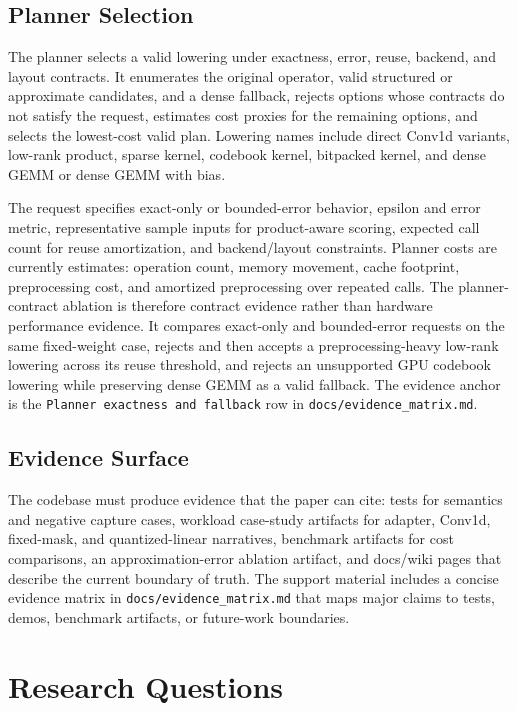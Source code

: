 \documentclass[11pt]{article}
\begin{document}
\subsection{Planner Selection}

The planner selects a valid lowering under exactness, error, reuse, backend,
and layout contracts. It enumerates the original operator, valid structured or
approximate candidates, and a dense fallback, rejects options whose contracts
do not satisfy the request, estimates cost proxies for the remaining options,
and selects the lowest-cost valid plan. Lowering names include direct Conv1d
variants, low-rank product, sparse kernel, codebook kernel, bitpacked kernel,
and dense GEMM or dense GEMM with bias.

The request specifies exact-only or bounded-error behavior, epsilon and error
metric, representative sample inputs for product-aware scoring, expected call
count for reuse amortization, and backend/layout constraints. Planner costs are
currently estimates: operation count, memory movement, cache footprint,
preprocessing cost, and amortized preprocessing over repeated calls. The
planner-contract ablation is therefore contract evidence rather than hardware
performance evidence. It compares exact-only and bounded-error requests on the
same fixed-weight case, rejects and then accepts a preprocessing-heavy
low-rank lowering across its reuse threshold, and rejects an unsupported GPU
codebook lowering while preserving dense GEMM as a valid fallback. The evidence
anchor is the \texttt{Planner exactness and fallback} row in
\texttt{docs/evidence\_matrix.md}.

\subsection{Evidence Surface}

The codebase must produce evidence that the paper can cite: tests for semantics
and negative capture cases, workload case-study artifacts for adapter, Conv1d,
fixed-mask, and quantized-linear narratives, benchmark artifacts for cost
comparisons, an approximation-error ablation artifact, and docs/wiki pages that
describe the current boundary of truth. The support material includes a concise
evidence matrix in \texttt{docs/evidence\_matrix.md} that maps major claims to
tests, demos, benchmark artifacts, or future-work boundaries.

\section{Research Questions}
\end{document}
